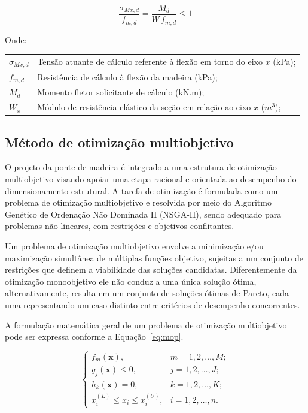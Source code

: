 \begin{equation}
\frac{\sigma_{Mx,d}}{f_{m,d}} = \frac{M_d}{W \, f_{m,d}} \leq 1
\label{eq:flexao_reta}
\end{equation}

Onde:

\begin{tabular}{ll}
$\sigma_{Mx,d}$ & Tensão atuante de cálculo referente à flexão em torno do eixo $x$ (kPa);\\
$f_{m,d}$ & Resistência de cálculo à flexão da madeira (kPa);\\
$M_d$ & Momento fletor solicitante de cálculo (kN.m);\\
$W_x$ & Módulo de resistência elástico da seção em relação ao eixo $x$ ($m^3$);\\
\end{tabular}

\subsection{Método de otimização multiobjetivo}

O projeto da ponte de madeira é integrado a uma estrutura de otimização multiobjetivo visando apoiar uma etapa racional e orientada ao desempenho do dimensionamento estrutural. A tarefa de otimização é formulada como um problema de otimização multiobjetivo e resolvida por meio do Algoritmo Genético de Ordenação Não Dominada II (NSGA-II), sendo adequado para problemas não lineares, com restrições e objetivos conflitantes.

Um problema de otimização multiobjetivo envolve a minimização e/ou maximização simultânea de múltiplas funções objetivo, sujeitas a um conjunto de restrições que definem a viabilidade das soluções candidatas. Diferentemente da otimização monoobjetivo ele não conduz a uma única solução ótima, alternativamente, resulta em um conjunto de soluções ótimas de Pareto, cada uma representando um caso distinto entre critérios de desempenho concorrentes.

A formulação matemática geral de um problema de otimização multiobjetivo pode ser expressa conforme a Equação~\eqref{eq:mop}.

\begin{equation}
\begin{cases} 
f_m(\mathbf{x}), & m = 1,2,\ldots,M; \\ 
g_j(\mathbf{x}) \leq 0, & j = 1,2,\ldots,J; \\ 
h_k(\mathbf{x}) = 0, & k = 1,2,\ldots,K; \\ 
x_i^{(L)} \leq x_i \leq x_i^{(U)}, & i = 1,2,\ldots,n.
\end{cases}
\label{eq:mop}
\end{equation}

